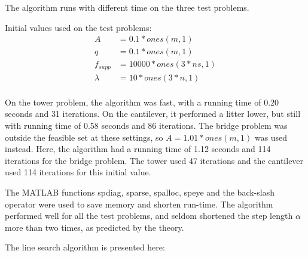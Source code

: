 The algorithm runs with different time on the three test problems. 


Initial values used on the test problems:      
\begin{align*}
		A &= 0.1*ones(m,1) \\
        q &= 0.1*ones(m,1) \\
        f_{supp} &= 10000*ones(3*ns,1) \\
        \lambda &= 10*ones(3*n,1) \\
\end{align*}   

On the tower problem, the algorithm was fast, with a running time of 0.20 seconds and 31 iterations. On the cantilever, it performed a litter lower, but still with running time of 0.58 seconds and 86 iterations. The bridge problem was outside the feasible set at these settings, so $A = 1.01*ones(m,1)$ was used instead. Here, the algorithm had a running time of 1.12 seconds and 114 iterations for the bridge problem. The tower used 47 iterations and the cantilever used 114 iterations for this initial value. 

The MATLAB functions spdiag, sparse, spalloc, speye and the back-slash operator were used to save memory and shorten run-time. The algorithm performed well for all the test problems, and seldom shortened the step length $\alpha$ more than two times, as predicted by the theory. 

The line search algorithm is presented here:

